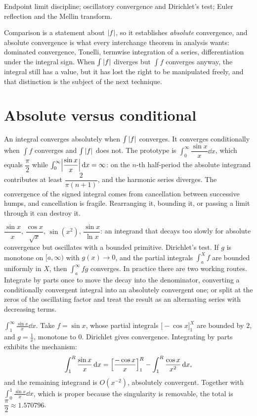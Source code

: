 \begin{seealsob}Endpoint limit discipline; oscillatory convergence and Dirichlet's test; Euler reflection and the Mellin transform.\end{seealsob}

Comparison is a statement about $\left\lvert f\right\rvert$, so it establishes \emph{absolute} convergence, and absolute convergence is what every interchange theorem in analysis wants: dominated convergence, Tonelli, termwise integration of a series, differentiation under the integral sign. When $\int\left\lvert f\right\rvert$ diverges but $\int f$ converges anyway, the integral still has a value, but it has lost the right to be manipulated freely, and that distinction is the subject of the next technique.

\section{Absolute versus conditional}

An integral converges absolutely when $\int\left\lvert f\right\rvert$ converges. It converges conditionally when $\int f$ converges and $\int\left\lvert f\right\rvert$ does not. The prototype is $\int_0^{\infty}\dfrac{\sin x}{x}\dd x$, which equals $\dfrac{\pi}{2}$ while $\int_0^{\infty}\Bigl|\dfrac{\sin x}{x}\Bigr|\,\mathrm{d} x=\infty$: on the $n$-th half-period the absolute integrand contributes at least $\dfrac{2}{\pi(n+1)}$, and the harmonic series diverges. The convergence of the signed integral comes from cancellation between successive humps, and cancellation is fragile. Rearranging it, bounding it, or passing a limit through it can destroy it.

\cue $\dfrac{\sin x}{x}$, $\dfrac{\cos x}{\sqrt x}$, $\sin(x^{2})$, $\dfrac{\sin x}{\ln x}$: an integrand that decays too slowly for absolute convergence but oscillates with a bounded primitive.
\method Dirichlet's test. If $g$ is monotone on $[a,\infty)$ with $g(x)\to0$, and the partial integrals $\int_a^{X}f$ are bounded uniformly in $X$, then $\int_a^{\infty}f g$ converges. In practice there are two working routes. Integrate by parts once to move the decay into the denominator, converting a conditionally convergent integral into an absolutely convergent one; or split at the zeros of the oscillating factor and treat the result as an alternating series with decreasing terms.

\begin{worked}
$\displaystyle\int_1^{\infty}\frac{\sin x}{x}\dd x$. Take $f=\sin x$, whose partial integrals $\bigl[-\cos x\bigr]_1^{X}$ are bounded by $2$, and $g=\tfrac1x$, monotone to $0$. Dirichlet gives convergence. Integrating by parts exhibits the mechanism:
\[\int_1^{R}\frac{\sin x}{x}\,\mathrm{d} x=\Bigl[\frac{-\cos x}{x}\Bigr]_1^{R}-\int_1^{R}\frac{\cos x}{x^{2}}\,\mathrm{d} x,\]
and the remaining integrand is $O(x^{-2})$, absolutely convergent. Together with $\int_0^{1}\tfrac{\sin x}{x}\dd x$, which is proper because the singularity is removable, the total is $\dfrac{\pi}{2}\approx1.570796$.
\end{worked}

